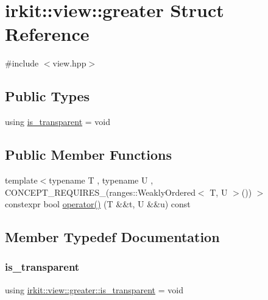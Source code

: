 \hypertarget{structirkit_1_1view_1_1greater}{}\section{irkit\+:\+:view\+:\+:greater Struct Reference}
\label{structirkit_1_1view_1_1greater}


{\ttfamily \#include $<$view.\+hpp$>$}

\subsection*{Public Types}
\begin{DoxyCompactItemize}
\item 
using \hyperlink{structirkit_1_1view_1_1greater_a794a252233bff89d1d8c9754ae4bf974}{is\+\_\+transparent} = void
\end{DoxyCompactItemize}
\subsection*{Public Member Functions}
\begin{DoxyCompactItemize}
\item 
{\footnotesize template$<$typename T , typename U , C\+O\+N\+C\+E\+P\+T\+\_\+\+R\+E\+Q\+U\+I\+R\+E\+S\+\_\+(ranges\+::\+Weakly\+Ordered$<$ T, U $>$()) $>$ }\\constexpr bool \hyperlink{structirkit_1_1view_1_1greater_af6f67e2c5f9976b8e6a4ff3ddc9fbd1d}{operator()} (T \&\&t, U \&\&u) const
\end{DoxyCompactItemize}


\subsection{Member Typedef Documentation}
\mbox{\label{structirkit_1_1view_1_1greater_a794a252233bff89d1d8c9754ae4bf974}} 
\subsubsection{\texorpdfstring{is\+\_\+transparent}{is\_transparent}}
{\footnotesize\ttfamily using \hyperlink{structirkit_1_1view_1_1greater_a794a252233bff89d1d8c9754ae4bf974}{irkit\+::view\+::greater\+::is\+\_\+transparent} =  void}



